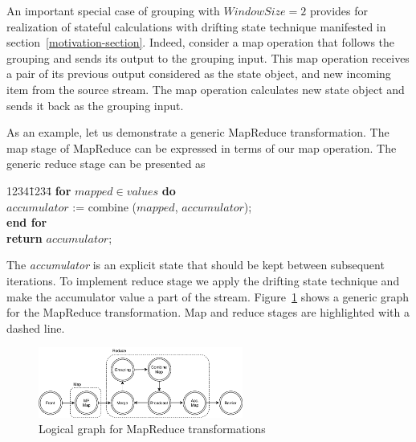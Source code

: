 
\label{fs-drifting}

An important special case of grouping with $Window Size = 2$  provides for realization of stateful calculations with drifting state technique manifested in section~\ref{motivation-section}. Indeed, consider a map operation that follows the grouping and sends its output to the grouping input. This map operation receives a pair of its previous output considered as the state object, and new incoming item from the source stream. The map operation calculates new state object and sends it back as the grouping input. 

As an example, let us demonstrate a generic MapReduce transformation. The map stage of MapReduce can be expressed in terms of our map operation. 
The generic reduce stage can be presented as

\begin {tabbing}
1234\=1234\= \kill
{\bf for} $mapped \in values$ {\bf do}   \\
\>$accumulator$ := combine ($mapped$, $accumulator$); \\
{\bf end for} \\
{\bf return } $accumulator$;
\end {tabbing}

The {\it accumulator} is an explicit state that should be kept between subsequent iterations.
%
%
To implement reduce stage we apply the drifting state technique and make the accumulator value a part of the stream. 
Figure~\ref{mapreduce-graph-figure} shows a generic graph for the MapReduce transformation. 
Map and reduce stages are highlighted with a dashed line. 

\begin{figure}[ht]
  \centering
  \includegraphics[width=0.6\textwidth]{pics/mapreduce}
  \caption{Logical graph for MapReduce transformations}
  \label {mapreduce-graph-figure}
\end{figure}

